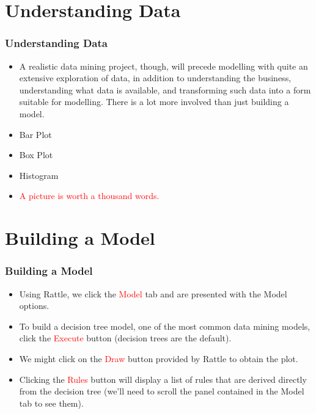 \documentclass{beamer}\usepackage[]{graphicx}\usepackage[]{color}
\begin{document}
\section{Understanding Data}
\begin{frame}
\frametitle{Understanding Data}
\begin{itemize}
\item A realistic data mining project, though, will precede modelling with quite an extensive exploration of data, in addition to understanding the business, understanding what data is available, and transforming such data into a form suitable for modelling. There is a lot more involved than just building a model.
\item Bar Plot
\item Box Plot
\item Histogram
\item \textcolor{red}{A picture is worth a thousand words.}
\end{itemize}
\end{frame}

\section{Building a Model}
\begin{frame}
\frametitle{Building a Model}
\begin{itemize}
\item Using Rattle, we click the \textcolor{red}{Model} tab and are presented with the Model options.
\item To build a decision tree model, one of the most common data mining models, click the \textcolor{red}{Execute} button (decision trees are the default).
\item We might click on the \textcolor{red}{Draw} button provided by Rattle to obtain the plot.
\item Clicking the \textcolor{red}{Rules} button will display a list of rules that are derived directly from the decision tree (we'll need to scroll the panel contained in the Model tab to see them).
\end{itemize}
\end{frame}
\end{document}
